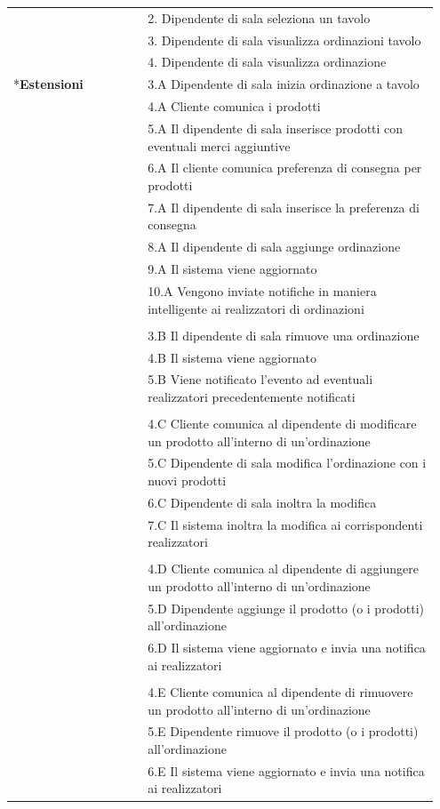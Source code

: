 \begin{longtable}[htbp]{|p{0.3\linewidth}|p{0.65\linewidth}|}
	& 2. Dipendente di sala seleziona un tavolo \\\
	& 3. Dipendente di sala visualizza ordinazioni tavolo \\
	& 4. Dipendente di sala visualizza ordinazione\\[0.3cm]
	\hline
	\newpage
	\multirow{28}*{\textbf{Estensioni}}
	& 3.A Dipendente di sala inizia ordinazione a tavolo \\
	& 4.A Cliente comunica i prodotti \\
	& 5.A Il dipendente di sala inserisce prodotti con eventuali merci aggiuntive \\
	& 6.A Il cliente comunica preferenza di consegna per prodotti \\
	& 7.A Il dipendente di sala inserisce la preferenza di consegna \\
	& 8.A Il dipendente di sala aggiunge ordinazione \\
	& 9.A Il sistema viene aggiornato \\
	& 10.A Vengono inviate notifiche in maniera  intelligente ai realizzatori di ordinazioni \\
	& \\
	& 3.B Il dipendente di sala rimuove una ordinazione \\
	& 4.B Il sistema viene aggiornato \\
	& 5.B Viene notificato l’evento ad eventuali realizzatori precedentemente notificati \\
	& \\
	& 4.C Cliente comunica al dipendente di modificare un prodotto all'interno di un'ordinazione \\
	& 5.C Dipendente di sala modifica l'ordinazione con i nuovi prodotti \\
	& 6.C Dipendente di sala inoltra la modifica \\
	& 7.C Il sistema inoltra la modifica ai corrispondenti realizzatori \\
	
	& \\
	& 4.D Cliente comunica al dipendente di aggiungere un prodotto all'interno di un'ordinazione \\
	& 5.D Dipendente aggiunge il prodotto (o i prodotti) all'ordinazione \\
	& 6.D Il sistema viene aggiornato e invia una notifica ai realizzatori \\
	
	& \\
	& 4.E Cliente comunica al dipendente di rimuovere un prodotto all'interno di un'ordinazione \\
	& 5.E Dipendente rimuove il prodotto (o i prodotti) all'ordinazione \\
	& 6.E Il sistema viene aggiornato e invia una notifica ai realizzatori \\[0.3cm]
	

\end{longtable}
